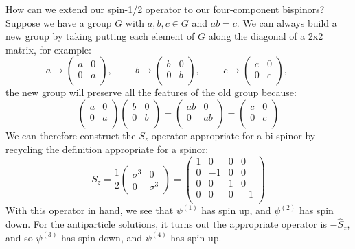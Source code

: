 \documentclass[12pt]{article}
\begin{document}
How can we extend our spin-1/2 operator to our four-component
bispinors?  Suppose we have a group $G$ with $a,b,c \in G$ and $ab =
c$.  We can always build a new group by taking putting each element of
$G$ along the diagonal of a 2x2 matrix, for example:
$$a \to \begin{pmatrix} a & 0 \\ 0 & a \\ \end{pmatrix}, \hspace{1cm}
b \to \begin{pmatrix} b & 0 \\ 0 & b \\ \end{pmatrix}, \hspace{1cm}
c \to \begin{pmatrix} c & 0 \\ 0 & c \\ \end{pmatrix}, \hspace{1cm}
$$
the new group will preserve all the features of the old group because:
$$\begin{pmatrix} a & 0 \\ 0 & a \\ \end{pmatrix}
\begin{pmatrix} b & 0 \\ 0 & b \\ \end{pmatrix}
= \begin{pmatrix} ab & 0 \\ 0 & ab \\ \end{pmatrix} =
\begin{pmatrix} c & 0 \\ 0 & c \\ \end{pmatrix}$$
We can therefore construct the $S_z$ operator appropriate for a
bi-spinor by recycling the definition appropriate for a spinor:
$$S_z = \frac{1}{2} \begin{pmatrix} \sigma^3 & 0 \\ 0 & \sigma^3 \end{pmatrix}
= \begin{pmatrix}
1 & 0 & 0 & 0 \\
0 &-1 & 0 & 0 \\
0 & 0 & 1 & 0 \\
0 & 0 & 0 &-1 \\
\end{pmatrix}
$$
With this operator in hand, we see that $\psi^{(1)}$ has spin up, and $\psi^{(2)}$ has spin down.
For the antiparticle solutions, it turns out the appropriate operator is $-\hat{S}_z$, and so $\psi^{(3)}$ has spin down, and $\psi^{(4)}$ has spin up.\\[5pt]
\end{document}
